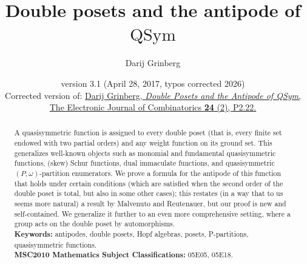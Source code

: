 \documentclass[numbers=enddot,12pt,final,onecolumn,notitlepage,abstracton]{scrartcl}
\theoremstyle{definition}
\newcommand{\QSym}{{\operatorname{QSym}}}
\begin{document}
\author{Darij Grinberg}

\title{Double posets and the antipode of $\QSym$}

\date{version 3.1 (April 28, 2017, typos corrected 2026) \\[1pc]
Corrected version of:
\href{https://doi.org/10.37236/6660}{%
Darij Grinberg, \textit{Double Posets and the Antipode of QSym},
The Electronic Journal of Combinatorics \textbf{24} (2), P2.22.}
}

\maketitle

\begin{abstract}
A quasisymmetric function is assigned to every double poset (that is,
every finite set endowed with two partial orders) and any weight function
on its ground set. This generalizes well-known objects such as monomial
and fundamental quasisymmetric functions, (skew) Schur functions, dual
immaculate functions, and quasisymmetric
$\left(P, \omega\right)$-partition enumerators.
We prove a formula for the antipode of this function that
holds under certain conditions (which are satisfied when the second order
of the double poset is total, but also in some other cases); this
restates (in a way that to us seems more natural) a
result by Malvenuto and Reutenauer, but our proof is new and
self-contained. We generalize it further to an even more comprehensive
setting, where a group acts on the double poset by automorphisms.
\\[0.2pc]

\textbf{Keywords:}
antipodes,
double posets,
Hopf algebras,
posets,
P-partitions,
quasisymmetric functions.
\\[0.2pc]

\textbf{MSC2010 Mathematics Subject Classifications:}
05E05, 05E18.
\end{abstract}

\end{document}
